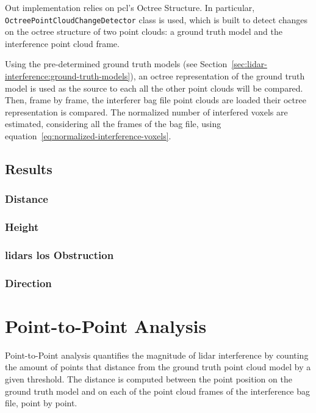 Out implementation relies on \ac{pcl}'s Octree Structure. In particular, \texttt{OctreePointCloudChangeDetector} class is used, which is built to detect changes on the octree structure of two point clouds: a ground truth model and the interference point cloud frame. 

Using the pre-determined ground truth models (see Section~\ref{sec:lidar-interference:ground-truth-models}), an octree representation of the ground truth model is used as the source to each all the other point clouds will be compared. Then, frame by frame, the interferer bag file point clouds are loaded their octree representation is compared. The normalized number of interfered voxels are estimated, considering all the frames of the bag file, using equation~\ref{eq:normalized-interference-voxels}.


\subsection{Results}
\label{subsec:lidar-interference:voxel-to-voxel-analysis}

\subsubsection{Distance}
\subsubsection{Height}
\subsubsection{\acp{lidar} \ac{los} Obstruction}
\subsubsection{Direction}



\section{Point-to-Point Analysis}
Point-to-Point analysis quantifies the magnitude of \ac{lidar} interference by counting the amount of points that distance from the ground truth point cloud model by a given threshold. The distance is computed between the point position on the ground truth model and on each of the point cloud frames of the interference bag file, point by point.

